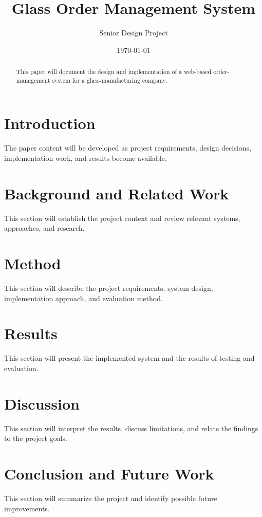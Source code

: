 \documentclass[12pt]{article}
\title{Glass Order Management System}
\author{Senior Design Project}
\date{\today}
\begin{document}
\maketitle

\begin{abstract}
This paper will document the design and implementation of a web-based order-management system for a glass-manufacturing company.
\end{abstract}

\section{Introduction}

The paper content will be developed as project requirements, design decisions, implementation work, and results become available.

\section{Background and Related Work}

This section will establish the project context and review relevant systems, approaches, and research.

\section{Method}

This section will describe the project requirements, system design, implementation approach, and evaluation method.

\section{Results}

This section will present the implemented system and the results of testing and evaluation.

\section{Discussion}

This section will interpret the results, discuss limitations, and relate the findings to the project goals.

\section{Conclusion and Future Work}

This section will summarize the project and identify possible future improvements.



\end{document}
